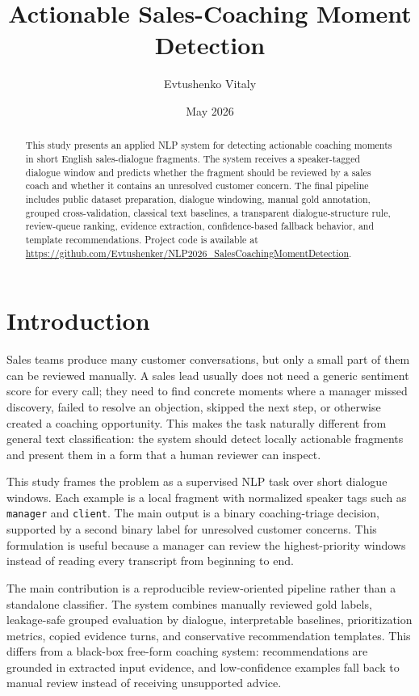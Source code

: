 \documentclass{article}
\title{Actionable Sales-Coaching Moment Detection}
\author{Evtushenko Vitaly}
\date{May 2026}
\begin{document}
\maketitle

\begin{abstract}
This study presents an applied NLP system for detecting actionable coaching moments in short English sales-dialogue fragments. The system receives a speaker-tagged dialogue window and predicts whether the fragment should be reviewed by a sales coach and whether it contains an unresolved customer concern. The final pipeline includes public dataset preparation, dialogue windowing, manual gold annotation, grouped cross-validation, classical text baselines, a transparent dialogue-structure rule, review-queue ranking, evidence extraction, confidence-based fallback behavior, and template recommendations. Project code is available at \url{https://github.com/Evtushenker/NLP2026_SalesCoachingMomentDetection}.
\end{abstract}

\section{Introduction}
Sales teams produce many customer conversations, but only a small part of them can be reviewed manually. A sales lead usually does not need a generic sentiment score for every call; they need to find concrete moments where a manager missed discovery, failed to resolve an objection, skipped the next step, or otherwise created a coaching opportunity. This makes the task naturally different from general text classification: the system should detect locally actionable fragments and present them in a form that a human reviewer can inspect.

This study frames the problem as a supervised NLP task over short dialogue windows. Each example is a local fragment with normalized speaker tags such as \texttt{manager} and \texttt{client}. The main output is a binary coaching-triage decision, supported by a second binary label for unresolved customer concerns. This formulation is useful because a manager can review the highest-priority windows instead of reading every transcript from beginning to end.

The main contribution is a reproducible review-oriented pipeline rather than a standalone classifier. The system combines manually reviewed gold labels, leakage-safe grouped evaluation by dialogue, interpretable baselines, prioritization metrics, copied evidence turns, and conservative recommendation templates. This differs from a black-box free-form coaching system: recommendations are grounded in extracted input evidence, and low-confidence examples fall back to manual review instead of receiving unsupported advice.
\end{document}
